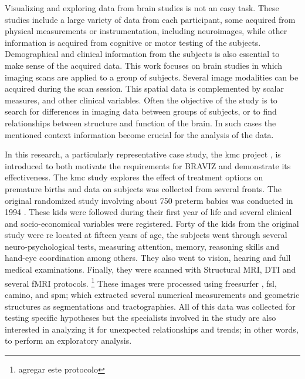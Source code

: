 \documentclass[utf8]{frontiersSCNS} %
\begin{document}
Visualizing and exploring data from brain studies is not an easy task. These studies include a large variety of data from each participant, some acquired from physical measurements or instrumentation, including neuroimages, while other information is acquired from cognitive or motor testing of the subjects. Demographical and clinical information from the subjects is also essential to make sense of the acquired data.
This work focuses on brain studies in which imaging scans are applied to a group of subjects. Several image modalities can be acquired during the scan session. This spatial data is complemented by scalar measures, and other clinical variables. Often the objective of the study is to search for differences in imaging data between groups of subjects, or to find relationships between structure and function of the brain. In such cases the mentioned context information become crucial for the analysis of the data. 


In this research, a particularly representative case study, the kmc project \cite{schneider_cerebral_2012}, is introduced to both motivate the requirements for BRAVIZ and demonstrate its effectiveness. The kmc study explores the effect of treatment options on premature births and data on subjects was collected from several fronts. The original randomized study involving about 750 preterm babies was conducted in 1994 \citep{charpak_kangaroo_1997}. These kids were followed during their first year \citep{charpak_randomized_2001, tessier_kangaroo_2009} of life and several clinical and socio-economical variables were registered. Forty of the kids from the original study were re located at fifteen years of age, the  subjects went through several neuro-psychological tests, measuring attention, memory, reasoning skills and hand-eye coordination among others. They also went to vision, hearing and full medical examinations. Finally, they were scanned with Structural MRI, DTI and several fMRI protocols. \footnote{agregar este protocolo} These images were processed using freesurfer \citep{fischl_freesurfer_2012}, fsl\citep{jenkinson_fsl_2012}, camino\citep{cook_camino:_2006}, and spm\citep{friston_statistical_2006}; which extracted several numerical measurements and geometric structures as segmentations and tractographies. All of this data was collected for testing specific hypotheses but the specialists involved in the study are also interested in analyzing it for unexpected relationships and trends; in other words, to perform an exploratory analysis\citep{tukey_we_1980}.
\end{document}
